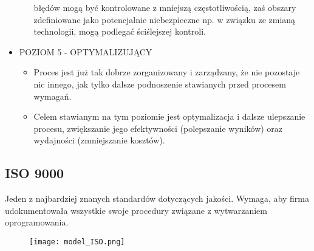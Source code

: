\documentclass[a4paper]{article}
\begin{document}
\begin{itemize}
\begin{itemize}
błędów mogą być kontrolowane z mniejszą
częstotliwością, zaś obszary zdefiniowane jako
potencjalnie niebezpieczne np. w związku ze zmianą
technologii, mogą podlegać ściślejszej kontroli.
        \end{itemize}
        \item POZIOM 5 - OPTYMALIZUJĄCY
        \begin{itemize}
            \item Proces jest już tak dobrze zorganizowany i zarządzany, że
            nie pozostaje nic innego, jak tylko dalsze podnoszenie
            stawianych przed procesem wymagań.
            \item Celem stawianym na tym poziomie jest optymalizacja i
            dalsze ulepszanie procesu, zwiększanie jego
            efektywności (polepszanie wyników) oraz wydajności
            (zmniejszanie kosztów).
        \end{itemize}
    \end{itemize}


\subsection{ISO 9000}
Jeden z najbardziej znanych standardów dotyczących jakości. Wymaga, aby firma udokumentowała wszystkie swoje procedury związane z wytwarzaniem oprogramowania.

\begin{figure}[!h]
\texttt{[image: model\_ISO.png]}
\end{figure}
\end{document}
